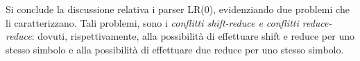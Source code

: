 \documentclass{subfiles}
\begin{document}
Si conclude la discussione relativa i parser LR(0), evidenziando due problemi che li caratterizzano.
Tali problemi, sono i \emph{conflitti shift-reduce \emph{e} conflitti reduce-reduce}:
dovuti, rispettivamente, alla possibilità di effettuare shift e reduce per uno stesso simbolo e alla possibilità di effettuare due reduce per uno stesso simbolo.
\end{document}

